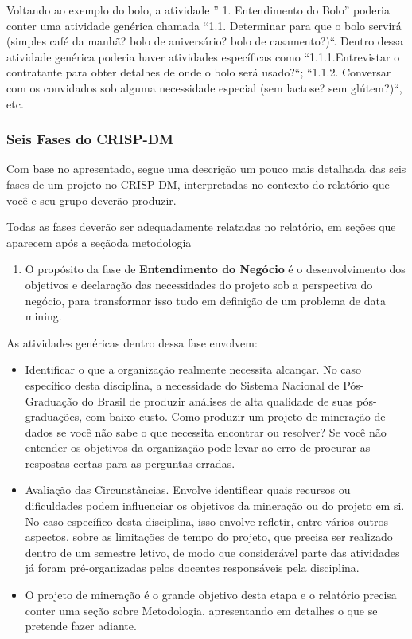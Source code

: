 \documentclass[]{article}
\providecommand{\tightlist}{%
  \setlength{\itemsep}{0pt}\setlength{\parskip}{0pt}}
\begin{document}
Voltando ao exemplo do bolo, a atividade '' 1. Entendimento do Bolo''
poderia conter uma atividade genérica chamada ``1.1. Determinar para que
o bolo servirá (simples café da manhã? bolo de aniversário? bolo de
casamento?)``. Dentro dessa atividade genérica poderia haver atividades
específicas como ``1.1.1.Entrevistar o contratante para obter detalhes
de onde o bolo será usado?``; ``1.1.2. Conversar com os convidados sob
alguma necessidade especial (sem lactose? sem glútem?)``, etc.

\subsubsection{Seis Fases do CRISP-DM}\label{seis-fases-do-crisp-dm}

Com base no apresentado, segue uma descrição um pouco mais detalhada das
seis fases de um projeto no CRISP-DM, interpretadas no contexto do
relatório que você e seu grupo deverão produzir.

Todas as fases deverão ser adequadamente relatadas no relatório, em
seções que aparecem após a seçãoda metodologia

\begin{enumerate}
\def\labelenumi{\arabic{enumi}.}
\tightlist
\item
  O propósito da fase de \textbf{Entendimento do Negócio} é o
  desenvolvimento dos objetivos e declaração das necessidades do projeto
  sob a perspectiva do negócio, para transformar isso tudo em definição
  de um problema de data mining.
\end{enumerate}

As atividades genéricas dentro dessa fase envolvem:

\begin{itemize}
\item
  Identificar o que a organização realmente necessita alcançar. No caso
  específico desta disciplina, a necessidade do Sistema Nacional de
  Pós-Graduação do Brasil de produzir análises de alta qualidade de suas
  pós-graduações, com baixo custo. Como produzir um projeto de mineração
  de dados se você não sabe o que necessita encontrar ou resolver? Se
  você não entender os objetivos da organização pode levar ao erro de
  procurar as respostas certas para as perguntas erradas.
\item
  Avaliação das Circunstâncias. Envolve identificar quais recursos ou
  dificuldades podem influenciar os objetivos da mineração ou do projeto
  em si. No caso específico desta disciplina, isso envolve refletir,
  entre vários outros aspectos, sobre as limitações de tempo do projeto,
  que precisa ser realizado dentro de um semestre letivo, de modo que
  considerável parte das atividades já foram pré-organizadas pelos
  docentes responsáveis pela disciplina.
\item
  O projeto de mineração é o grande objetivo desta etapa e o relatório
  precisa conter uma seção sobre Metodologia, apresentando em detalhes o
  que se pretende fazer adiante.
\end{itemize}
\end{document}
